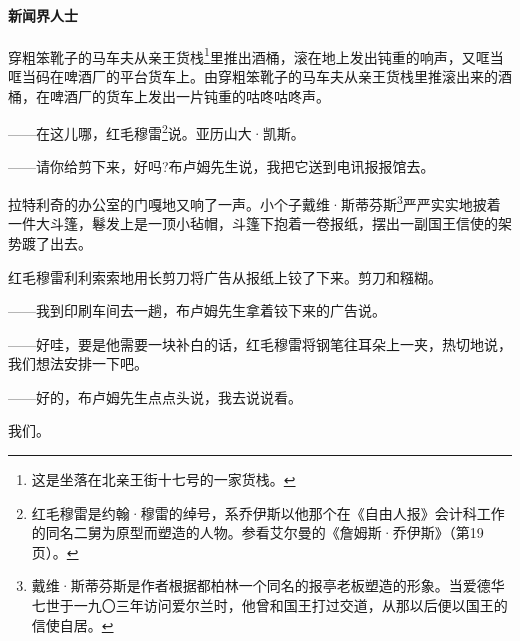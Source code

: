 \paragraph*{新闻界人士}
\par 穿粗笨靴子的马车夫从亲王货栈\footnote{这是坐落在北亲王街十七号的一家货栈。}里推出酒桶，滚在地上发出钝重的响声，又哐当哐当码在啤酒厂的平台货车上。由穿粗笨靴子的马车夫从亲王货栈里推滚出来的酒桶，在啤酒厂的货车上发出一片钝重的咕咚咕咚声。
\par ——在这儿哪，红毛穆雷\footnote{红毛穆雷是约翰·穆雷的绰号，系乔伊斯以他那个在《自由人报》会计科工作的同名二舅为原型而塑造的人物。参看艾尔曼的《詹姆斯·乔伊斯》（第19页）。}说。亚历山大·凯斯。
\par ——请你给剪下来，好吗?布卢姆先生说，我把它送到电讯报报馆去。
\par 拉特利奇的办公室的门嘎地又响了一声。小个子戴维·斯蒂芬斯\footnote{戴维·斯蒂芬斯是作者根据都柏林一个同名的报亭老板塑造的形象。当爱德华七世于一九〇三年访问爱尔兰时，他曾和国王打过交道，从那以后便以国王的信使自居。}严严实实地披着一件大斗篷，鬈发上是一顶小毡帽，斗篷下抱着一卷报纸，摆出一副国王信使的架势踱了出去。
\par 红毛穆雷利利索索地用长剪刀将广告从报纸上铰了下来。剪刀和糨糊。
\par ——我到印刷车间去一趟，布卢姆先生拿着铰下来的广告说。
\par ——好哇，要是他需要一块补白的话，红毛穆雷将钢笔往耳朵上一夹，热切地说，我们想法安排一下吧。
\par ——好的，布卢姆先生点点头说，我去说说看。
\par 我们。

